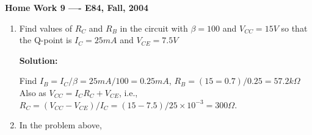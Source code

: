 \usepackage{html}

\begin{center}
{\Large \bf  Home Work 9 ---- E84, Fall, 2004}
\end{center}
\begin{enumerate}

\item Find values of $R_C$ and $R_B$ in the circuit with $\beta=100$
and $V_{CC}=15V$ so that the Q-point is $I_C=25mA$ and $V_{CE}=7.5V$

{\bf Solution:}

Find $I_B=I_C/\beta=25mA/100=0.25mA$, $R_B=(15=0.7)/0.25=57.2k\Omega$
Also as $V_{CC}=I_C R_C+V_{CE}$, i.e., $R_C=(V_{CC}-V_{CE})/I_C=
(15-7.5)/25\times 10^{-3}=300\Omega$.

\item In the problem above, 



\end{enumerate}



